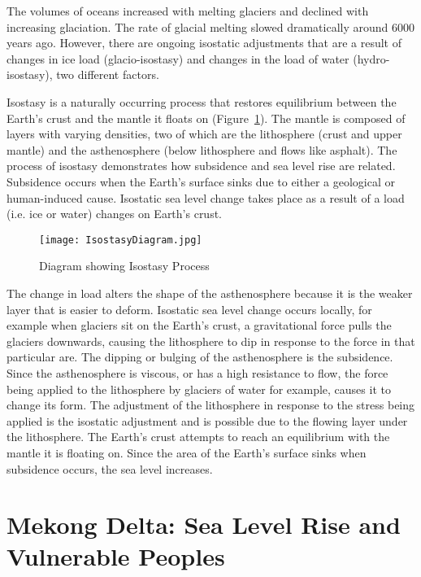 The volumes of oceans increased with melting glaciers and declined with increasing glaciation. The rate of glacial melting slowed dramatically around 6000 years ago. However, there are ongoing isostatic adjustments that are a result of changes in ice load (glacio-isostasy) and changes in the load of water (hydro-isostasy), two different factors. 
  
Isostasy is a naturally occurring process that restores equilibrium between the Earth's crust and the mantle it floats on (Figure~\ref{fig:isostasy}). The mantle is composed of layers with varying densities, two of which are the lithosphere (crust and upper mantle) and the asthenosphere (below lithosphere and flows like asphalt). The process of isostasy demonstrates how subsidence and sea level rise are related. Subsidence occurs when the Earth's surface sinks due to either a geological or human-induced cause. Isostatic sea level change takes place as a result of a load (i.e. ice or water) changes on Earth's crust.

\begin{figure}
\centering
\texttt{[image: IsostasyDiagram.jpg]}
\caption {Diagram showing Isostasy Process}
\label{fig:isostasy}
\end{figure}

The change in load alters the shape of the asthenosphere because it is the weaker layer that is easier to deform. Isostatic sea level change occurs locally, for example when glaciers sit on the Earth's crust, a gravitational force pulls the glaciers downwards, causing the lithosphere to dip in response to the force in that particular are. The dipping or bulging of the asthenosphere is the subsidence. Since the asthenosphere is viscous, or has a high resistance to flow, the force being applied to the lithosphere by glaciers of water for example, causes it to change its form. The adjustment of the lithosphere in response to the stress being applied is the isostatic adjustment and is possible due to the flowing layer under the lithosphere. The Earth's crust attempts to reach an equilibrium with the mantle it is floating on. Since the area of the Earth's surface sinks when subsidence occurs, the sea level increases. 



    
\section{Mekong Delta: Sea Level Rise and Vulnerable Peoples}

